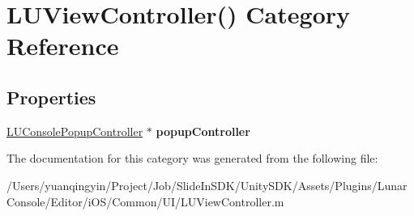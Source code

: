 \hypertarget{category_l_u_view_controller_07_08}{}\section{L\+U\+View\+Controller() Category Reference}
\label{category_l_u_view_controller_07_08}
\subsection*{Properties}
\begin{DoxyCompactItemize}
\item 
\mbox{\label{category_l_u_view_controller_07_08_aad60f9d99e6b6b26acaabf6b77410fef}} 
\mbox{\hyperlink{interface_l_u_console_popup_controller}{L\+U\+Console\+Popup\+Controller}} $\ast$ {\bfseries popup\+Controller}
\end{DoxyCompactItemize}


The documentation for this category was generated from the following file\+:\begin{DoxyCompactItemize}
\item 
/\+Users/yuanqingyin/\+Project/\+Job/\+Slide\+In\+S\+D\+K/\+Unity\+S\+D\+K/\+Assets/\+Plugins/\+Lunar\+Console/\+Editor/i\+O\+S/\+Common/\+U\+I/L\+U\+View\+Controller.\+m\end{DoxyCompactItemize}
